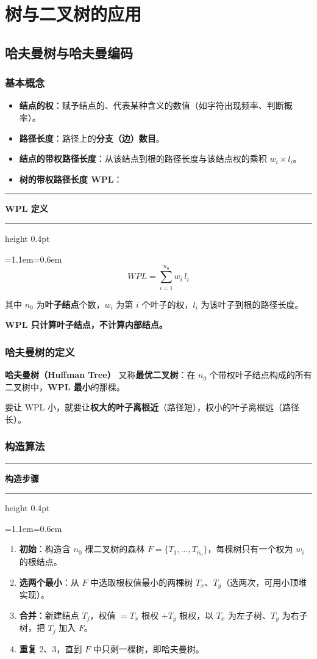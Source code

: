\documentclass[11pt,openany,UTF8]{ctexbook}
\newcommand{\callouthead}[2]{%
  \par\addvspace{7pt}\noindent
  {\color{#1}\rule[-0.15em]{3pt}{1.05em}}\hspace{0.5em}%
  {\bfseries\color{#1}#2}\par\nobreak\vspace{-0.35em}%
  {\color{rulesep}\hrule height 0.4pt}\nobreak\vspace{0.45em}%
  \begingroup\small\setlength{\parindent}{0pt}%
  \leftskip=1.1em\rightskip=0.6em\noindent\ignorespaces}
\newcommand{\calloutend}{\par\endgroup\addvspace{7pt}}
\newenvironment{callkey}[1]{\callouthead{keybar}{#1}}{\calloutend}
\begin{document}
\section{树与二叉树的应用}

\subsection{哈夫曼树与哈夫曼编码}

\subsubsection{基本概念}

\begin{itemize}
\item \textbf{结点的权}：赋予结点的、代表某种含义的数值（如字符出现频率、判断概率）。
\item \textbf{路径长度}：路径上的\textbf{分支（边）数目}。
\item \textbf{结点的带权路径长度}：从该结点到根的路径长度与该结点权的乘积 $w_i\times l_i$。
\item \textbf{树的带权路径长度 WPL}：
\end{itemize}
\begin{callkey}{WPL 定义}
\[WPL=\sum_{i=1}^{n_0} w_i\, l_i\]

其中 $n_0$ 为\textbf{叶子结点}个数，$w_i$ 为第 $i$ 个叶子的权，$l_i$ 为该叶子到根的路径长度。

\textbf{WPL 只计算叶子结点，不计算内部结点。}

\end{callkey}

\subsubsection{哈夫曼树的定义}

\textbf{哈夫曼树（Huffman Tree）} 又称\textbf{最优二叉树}：在 $n_0$ 个带权叶子结点构成的所有二叉树中，\textbf{WPL 最小}的那棵。

要让 WPL 小，就要让\textbf{权大的叶子离根近}（路径短），权小的叶子离根远（路径长）。

\subsubsection{构造算法}

\begin{callkey}{构造步骤}
\begin{enumerate}
\item \textbf{初始}：构造含 $n_0$ 棵二叉树的森林 $F=\{T_1,\dots,T_{n_0}\}$，每棵树只有一个权为 $w_i$ 的根结点。
\item \textbf{选两个最小}：从 $F$ 中选取根权值最小的两棵树 $T_x$、$T_y$（选两次，可用小顶堆实现）。
\item \textbf{合并}：新建结点 $T_j$，权值 $=T_x$ 根权 $+T_y$ 根权，以 $T_x$ 为左子树、$T_y$ 为右子树，把 $T_j$ 加入 $F$。
\item \textbf{重复} 2、3，直到 $F$ 中只剩一棵树，即哈夫曼树。
\end{enumerate}
\end{callkey}
\end{document}
